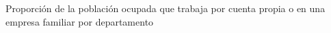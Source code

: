 Proporción de la población ocupada que trabaja por cuenta propia o en una empresa familiar por departamento